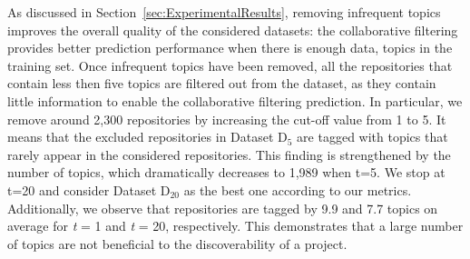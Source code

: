 As discussed in Section~\ref{sec:ExperimentalResults}, removing infrequent 
topics improves the overall quality of the considered datasets: %
the collaborative filtering provides better prediction performance when there is enough data, \ie topics in the training set. %
Once infrequent topics have been removed, all the repositories that contain 
less then five topics are filtered out from the dataset, as they contain little 
information to enable the collaborative filtering prediction. In particular, we 
remove around 2,300 repositories by increasing the cut-off value from 1 to 5. 
It means that the excluded repositories in Dataset D$_5$ are tagged with topics 
that rarely appear in the considered repositories. This finding is strengthened 
by the number of topics, which dramatically decreases to 1,989 when t=5. %
We stop at t=20 and consider Dataset D$_{20}$ as the best one according to our metrics. Additionally, we observe that repositories are tagged by 9.9 and 7.7 topics on average for \emph{t} = 1 and \emph{t} = 20, respectively. This demonstrates that a large number of topics are not beneficial to the discoverability of a project.


 


